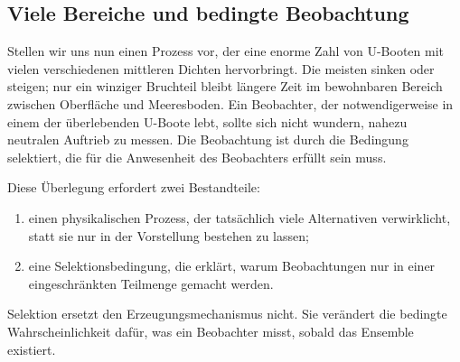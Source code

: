 \begin{classroomqa}
\end{classroomqa}

\subsection{Viele Bereiche und bedingte Beobachtung}

Stellen wir uns nun einen Prozess vor, der eine enorme Zahl von U-Booten mit vielen verschiedenen mittleren Dichten hervorbringt. Die meisten sinken oder steigen; nur ein winziger Bruchteil bleibt längere Zeit im bewohnbaren Bereich zwischen Oberfläche und Meeresboden. Ein Beobachter, der notwendigerweise in einem der überlebenden U-Boote lebt, sollte sich nicht wundern, nahezu neutralen Auftrieb zu messen. Die Beobachtung ist durch die Bedingung selektiert, die für die Anwesenheit des Beobachters erfüllt sein muss.

Diese Überlegung erfordert zwei Bestandteile:
\begin{enumerate}
\item einen physikalischen Prozess, der tatsächlich viele Alternativen verwirklicht, statt sie nur in der Vorstellung bestehen zu lassen;
\item eine Selektionsbedingung, die erklärt, warum Beobachtungen nur in einer eingeschränkten Teilmenge gemacht werden.
\end{enumerate}
Selektion ersetzt den Erzeugungsmechanismus nicht. Sie verändert die bedingte Wahrscheinlichkeit dafür, was ein Beobachter misst, sobald das Ensemble existiert.

\begin{classroomqa}
\end{classroomqa}

